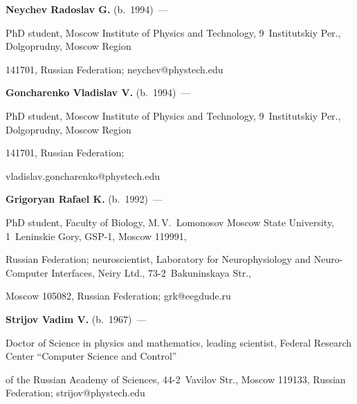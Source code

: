 \pagebreak



\noindent

\textbf{Neychev Radoslav G.} (b.\ 1994)~--- 

PhD student, Moscow Institute of Physics and Technology, 9~Institutskiy Per., Dolgoprudny, Moscow Region

 141701, Russian Federation; \mbox{neychev@phystech.edu}



\vspace*{3pt}



\noindent

\textbf{Goncharenko Vladislav V.} (b.\ 1994)~--- 

PhD student, Moscow Institute of Physics and Technology, 9~Institutskiy Per., Dolgoprudny, Moscow Region

 141701, Russian Federation; 

\mbox{vladislav.goncharenko@phystech.edu}



\vspace*{3pt}



\noindent

\textbf{Grigoryan Rafael K.} (b.\ 1992)~--- 

PhD student, Faculty of Biology, M.\,V.~Lomonosov Moscow State University, 1~Leninskie Gory, GSP-1, Moscow 119991, 

Russian Federation; neuroscientist, Laboratory for Neurophysiology and Neuro-Computer Interfaces, Neiry Ltd., 73-2~Bakuninskaya Str., 

Moscow 105082, Russian Federation; \mbox{grk@eegdude.ru}



\vspace*{3pt}



\noindent

\textbf{Strijov Vadim V.} (b.\ 1967)~--- 

Doctor of Science in physics and mathematics, leading scientist, Federal Research Center ``Computer Science and Control'' 

of the Russian Academy of Sciences, 44-2~Vavilov Str., Moscow 119133, Russian Federation; \mbox{strijov@phystech.edu}









 

\label{end\stat}



\renewcommand{\bibname}{\protect\rm Литература} 


